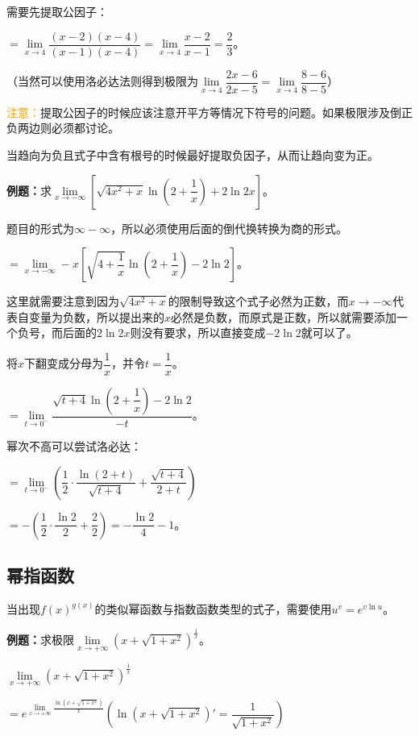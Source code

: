 \documentclass[UTF8, 12pt]{ctexart}
\begin{document}
需要先提取公因子：

$=\lim\limits_{x\to 4}\dfrac{(x-2)(x-4)}{(x-1)(x-4)}=\lim\limits_{x\to 4}\dfrac{x-2}{x-1}=\dfrac{2}{3}$。

（当然可以使用洛必达法则得到极限为$\lim\limits_{x\to 4}\dfrac{2x-6}{2x-5}=\lim\limits_{x\to 4}\dfrac{8-6}{8-5}$）

\textcolor{orange}{注意：}提取公因子的时候应该注意开平方等情况下符号的问题。如果极限涉及倒正负两边则必须都讨论。

当趋向为负且式子中含有根号的时候最好提取负因子，从而让趋向变为正。\medskip

\textbf{例题：}求$\lim\limits_{x\to-\infty}\left[\sqrt{4x^2+x}\ln\left(2+\dfrac{1}{x}\right)+2\ln 2x\right]$。\medskip

题目的形式为$\infty-\infty$，所以必须使用后面的倒代换转换为商的形式。\medskip

$=\lim\limits_{x\to-\infty}-x\left[\sqrt{4+\dfrac{1}{x}}\ln\left(2+\dfrac{1}{x}\right)-2\ln 2\right]$。 \medskip

这里就需要注意到因为$\sqrt{4x^2+x}$的限制导致这个式子必然为正数，而$x\to-\infty$代表自变量为负数，所以提出来的$x$必然是负数，而原式是正数，所以就需要添加一个负号，而后面的$2\ln 2x$则没有要求，所以直接变成$-2\ln 2$就可以了。

将$x$下翻变成分母为$\dfrac{1}{x}$，并令$t=\dfrac{1}{x}$。\medskip

$=\lim\limits_{t\to 0^-}\dfrac{\sqrt{t+4}\ln\left(2+\dfrac{1}{x}\right)-2\ln 2}{-t}$。\medskip

幂次不高可以尝试洛必达：\medskip

$=\lim\limits_{t\to 0^-}\left(\dfrac{1}{2}\cdot\dfrac{\ln(2+t)}{\sqrt{t+4}}+\dfrac{\sqrt{t+4}}{2+t}\right)$\medskip

$=-\left(\dfrac{1}{2}\cdot\dfrac{\ln 2}{2}+\dfrac{2}{2}\right)=-\dfrac{\ln 2}{4}-1$。

\subsection{幂指函数}

当出现$f(x)^{g(x)}$的类似幂函数与指数函数类型的式子，需要使用$u^v=e^{v\ln u}$。

\textbf{例题：}求极限$\lim\limits_{x\to+\infty}(x+\sqrt{1+x^2})^{\frac{1}{x}}$。\medskip

$\lim\limits_{x\to+\infty}(x+\sqrt{1+x^2})^{\frac{1}{x}}$ \medskip

$=e^{\lim\limits_{x\to+\infty}\frac{\ln(x+\sqrt{1+x^2})}{x}} \left(\ln(x+\sqrt{1+x^2})'=\dfrac{1}{\sqrt{1+x^2}}\right)$\medskip
\end{document}
